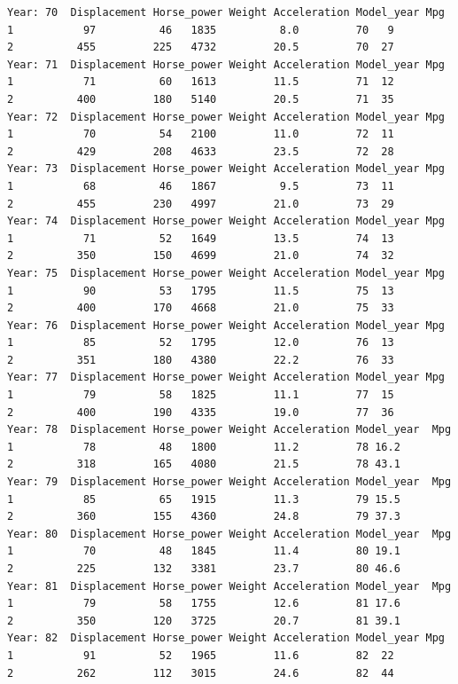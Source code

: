 \begin{verbatim}
Year: 70  Displacement Horse_power Weight Acceleration Model_year Mpg
1           97          46   1835          8.0         70   9
2          455         225   4732         20.5         70  27
Year: 71  Displacement Horse_power Weight Acceleration Model_year Mpg
1           71          60   1613         11.5         71  12
2          400         180   5140         20.5         71  35
Year: 72  Displacement Horse_power Weight Acceleration Model_year Mpg
1           70          54   2100         11.0         72  11
2          429         208   4633         23.5         72  28
Year: 73  Displacement Horse_power Weight Acceleration Model_year Mpg
1           68          46   1867          9.5         73  11
2          455         230   4997         21.0         73  29
Year: 74  Displacement Horse_power Weight Acceleration Model_year Mpg
1           71          52   1649         13.5         74  13
2          350         150   4699         21.0         74  32
Year: 75  Displacement Horse_power Weight Acceleration Model_year Mpg
1           90          53   1795         11.5         75  13
2          400         170   4668         21.0         75  33
Year: 76  Displacement Horse_power Weight Acceleration Model_year Mpg
1           85          52   1795         12.0         76  13
2          351         180   4380         22.2         76  33
Year: 77  Displacement Horse_power Weight Acceleration Model_year Mpg
1           79          58   1825         11.1         77  15
2          400         190   4335         19.0         77  36
Year: 78  Displacement Horse_power Weight Acceleration Model_year  Mpg
1           78          48   1800         11.2         78 16.2
2          318         165   4080         21.5         78 43.1
Year: 79  Displacement Horse_power Weight Acceleration Model_year  Mpg
1           85          65   1915         11.3         79 15.5
2          360         155   4360         24.8         79 37.3
Year: 80  Displacement Horse_power Weight Acceleration Model_year  Mpg
1           70          48   1845         11.4         80 19.1
2          225         132   3381         23.7         80 46.6
Year: 81  Displacement Horse_power Weight Acceleration Model_year  Mpg
1           79          58   1755         12.6         81 17.6
2          350         120   3725         20.7         81 39.1
Year: 82  Displacement Horse_power Weight Acceleration Model_year Mpg
1           91          52   1965         11.6         82  22
2          262         112   3015         24.6         82  44
\end{verbatim}

